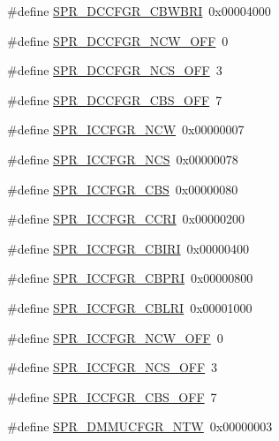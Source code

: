 \begin{DoxyCompactItemize}
\item 
\#define \hyperlink{spr-defs_8h_a8649b7c7e3cea1917dc3281f1b3fe1c4}{\-S\-P\-R\-\_\-\-D\-C\-C\-F\-G\-R\-\_\-\-C\-B\-W\-B\-R\-I}~0x00004000
\item 
\#define \hyperlink{spr-defs_8h_a7018002070da3d157e14d087c7137725}{\-S\-P\-R\-\_\-\-D\-C\-C\-F\-G\-R\-\_\-\-N\-C\-W\-\_\-\-O\-F\-F}~0
\item 
\#define \hyperlink{spr-defs_8h_af8232ed2f568e4240ee31070425e5598}{\-S\-P\-R\-\_\-\-D\-C\-C\-F\-G\-R\-\_\-\-N\-C\-S\-\_\-\-O\-F\-F}~3
\item 
\#define \hyperlink{spr-defs_8h_a4670691827bbdc237d74a1752892478c}{\-S\-P\-R\-\_\-\-D\-C\-C\-F\-G\-R\-\_\-\-C\-B\-S\-\_\-\-O\-F\-F}~7
\item 
\#define \hyperlink{spr-defs_8h_a8b99aff4c0d2e25aca54946a818bcb90}{\-S\-P\-R\-\_\-\-I\-C\-C\-F\-G\-R\-\_\-\-N\-C\-W}~0x00000007
\item 
\#define \hyperlink{spr-defs_8h_a8367d6f38a8fcf01a3784b4efa410069}{\-S\-P\-R\-\_\-\-I\-C\-C\-F\-G\-R\-\_\-\-N\-C\-S}~0x00000078
\item 
\#define \hyperlink{spr-defs_8h_a7aadbfaabdcd16a1158d6893339a8823}{\-S\-P\-R\-\_\-\-I\-C\-C\-F\-G\-R\-\_\-\-C\-B\-S}~0x00000080
\item 
\#define \hyperlink{spr-defs_8h_ad8c6370952a4cc53a6ea733414809404}{\-S\-P\-R\-\_\-\-I\-C\-C\-F\-G\-R\-\_\-\-C\-C\-R\-I}~0x00000200
\item 
\#define \hyperlink{spr-defs_8h_a86273007edfbea1ebb2a158f7d31d09d}{\-S\-P\-R\-\_\-\-I\-C\-C\-F\-G\-R\-\_\-\-C\-B\-I\-R\-I}~0x00000400
\item 
\#define \hyperlink{spr-defs_8h_a00ceaa50ba8d1b92cf8a08565a9e0a4e}{\-S\-P\-R\-\_\-\-I\-C\-C\-F\-G\-R\-\_\-\-C\-B\-P\-R\-I}~0x00000800
\item 
\#define \hyperlink{spr-defs_8h_a68376e0c3c769bcc88de25e4fb8b4530}{\-S\-P\-R\-\_\-\-I\-C\-C\-F\-G\-R\-\_\-\-C\-B\-L\-R\-I}~0x00001000
\item 
\#define \hyperlink{spr-defs_8h_a63d5703703fdba9bf1f61be99249419d}{\-S\-P\-R\-\_\-\-I\-C\-C\-F\-G\-R\-\_\-\-N\-C\-W\-\_\-\-O\-F\-F}~0
\item 
\#define \hyperlink{spr-defs_8h_a5d76054bf3381c3bf15d8b2f815a1e9e}{\-S\-P\-R\-\_\-\-I\-C\-C\-F\-G\-R\-\_\-\-N\-C\-S\-\_\-\-O\-F\-F}~3
\item 
\#define \hyperlink{spr-defs_8h_ae942807ea91204d8b4ed011ac05d582f}{\-S\-P\-R\-\_\-\-I\-C\-C\-F\-G\-R\-\_\-\-C\-B\-S\-\_\-\-O\-F\-F}~7
\item 
\#define \hyperlink{spr-defs_8h_a57c9ea6f481e2d4b16479264d672f2d9}{\-S\-P\-R\-\_\-\-D\-M\-M\-U\-C\-F\-G\-R\-\_\-\-N\-T\-W}~0x00000003

\end{DoxyCompactItemize}
